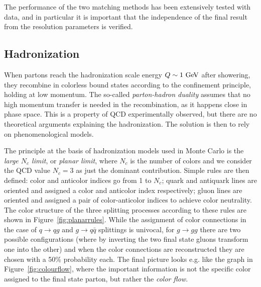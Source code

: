 The performance of the two matching methods has been extensively tested
with data, and in particular it is important that the independence of
the final result from the resolution parameters is verified.


\subsection{Hadronization}\label{sec:hadronization}

When partons reach the hadronization scale energy $Q\sim 1\gev$ after showering,
they recombine in colorless bound states according to the confinement
principle, holding at low momentum. The so-called {\it parton-hadron duality}
assumes that no high momentum transfer is needed in the recombination,
as it happens  close in phase space. This is a property of QCD
experimentally observed, but there are no theoretical arguments
explaining the hadronization. The solution is then to rely on
phenomenological models.

The principle at the basis of hadronization models used in Monte Carlo is the 
{\it large $N_c$ limit}, or {\it planar limit}, where $N_c$ is the number
of colors and we consider the QCD value $N_c = 3$ as just the dominant
contribution. Simple rules are then defined: color and anticolor indices
go from 1 to $N_c$; quark and antiquark lines are oriented and assigned
a color and anticolor index respectively; gluon lines are oriented and assigned
a pair of color-anticolor indices to achieve color neutrality. 
The color structure of the three splitting
processes according to these rules are shown in Figure~\ref{fig:planarrules}.
While the assignment of color connections in the case of $q\to qg$ and
$g\to q\bar{q}$ splittings is univocal, for $g\to gg$ there are two possible
configurations (where by inverting the two final state gluons transform one
into the other) and when the color connections are reconstructed they are chosen
with a 50\% probability each. The final picture looks e.g. like the graph
in Figure~\ref{fig:colourflow}, where the important information is not the
specific color assigned to the final state parton, but rather the {\it color flow}.


